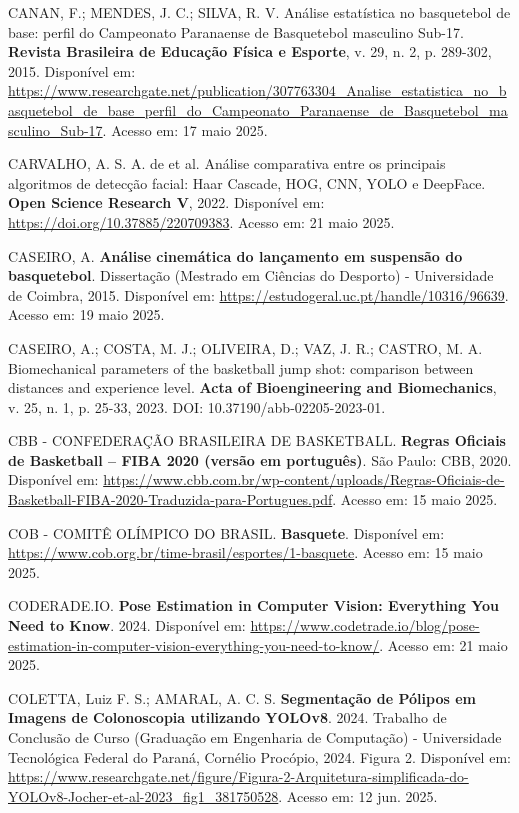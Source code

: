 \begin{flushleft}
CANAN, F.; MENDES, J. C.; SILVA, R. V. Análise estatística no basquetebol de base: perfil do Campeonato Paranaense de Basquetebol masculino Sub-17. \textbf{Revista Brasileira de Educação Física e Esporte}, v. 29, n. 2, p. 289-302, 2015. Disponível em: \url{https://www.researchgate.net/publication/307763304_Analise_estatistica_no_basquetebol_de_base_perfil_do_Campeonato_Paranaense_de_Basquetebol_masculino_Sub-17}. Acesso em: 17 maio 2025.

CARVALHO, A. S. A. de et al. Análise comparativa entre os principais algoritmos de detecção facial: Haar Cascade, HOG, CNN, YOLO e DeepFace. \textbf{Open Science Research V}, 2022. Disponível em: \url{https://doi.org/10.37885/220709383}. Acesso em: 21 maio 2025.

CASEIRO, A. \textbf{Análise cinemática do lançamento em suspensão do basquetebol}. Dissertação (Mestrado em Ciências do Desporto) - Universidade de Coimbra, 2015. Disponível em: \url{https://estudogeral.uc.pt/handle/10316/96639}. Acesso em: 19 maio 2025.

CASEIRO, A.; COSTA, M. J.; OLIVEIRA, D.; VAZ, J. R.; CASTRO, M. A. Biomechanical parameters of the basketball jump shot: comparison between distances and experience level. \textbf{Acta of Bioengineering and Biomechanics}, v. 25, n. 1, p. 25-33, 2023. DOI: 10.37190/abb-02205-2023-01.

CBB - CONFEDERAÇÃO BRASILEIRA DE BASKETBALL. \textbf{Regras Oficiais de Basketball – FIBA 2020 (versão em português)}. São Paulo: CBB, 2020. Disponível em: \url{https://www.cbb.com.br/wp-content/uploads/Regras-Oficiais-de-Basketball-FIBA-2020-Traduzida-para-Portugues.pdf}. Acesso em: 15 maio 2025.

COB - COMITÊ OLÍMPICO DO BRASIL. \textbf{Basquete}. Disponível em: \url{https://www.cob.org.br/time-brasil/esportes/1-basquete}. Acesso em: 15 maio 2025.

CODERADE.IO. \textbf{Pose Estimation in Computer Vision: Everything You Need to Know}. 2024. Disponível em: \url{https://www.codetrade.io/blog/pose-estimation-in-computer-vision-everything-you-need-to-know/}. Acesso em: 21 maio 2025.

COLETTA, Luiz F. S.; AMARAL, A. C. S. \textbf{Segmentação de Pólipos em Imagens de Colonoscopia utilizando YOLOv8}. 2024. Trabalho de Conclusão de Curso (Graduação em Engenharia de Computação) - Universidade Tecnológica Federal do Paraná, Cornélio Procópio, 2024. Figura 2. Disponível em: \url{https://www.researchgate.net/figure/Figura-2-Arquitetura-simplificada-do-YOLOv8-Jocher-et-al-2023_fig1_381750528}. Acesso em: 12 jun. 2025.


\end{flushleft}

